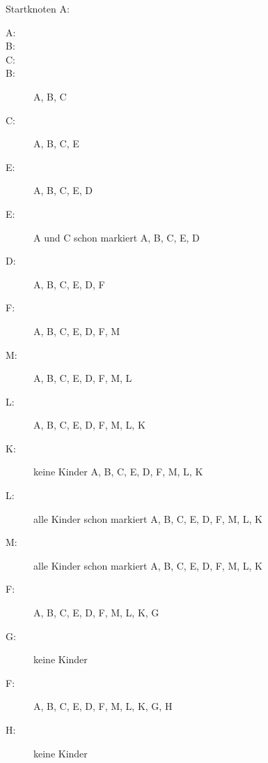 \documentclass{lehramt-informatik-haupt}
\begin{document}
Startknoten A:

\begin{description}

\item[A:]

\item[B:]

\item[C:]

\item[B:]
A, B, C

\item[C:]
A, B, C, E

\item[E:]
A, B, C, E, D

\item[E:]
A und C schon
markiert
A, B, C, E, D

\item[D:]
A, B, C, E, D, F

\item[F:]
A, B, C, E, D, F, M

\item[M:]
A, B, C, E, D, F, M, L

\item[L:]
A, B, C, E, D, F, M, L, K

\item[K:] keine Kinder
A, B, C, E, D, F, M, L, K

\item[L:] alle Kinder schon markiert
A, B, C, E, D, F, M, L, K

\item[M:] alle Kinder schon markiert
A, B, C, E, D, F, M, L, K

\item[F:]
A, B, C, E, D, F, M, L, K, G

\item[G:] keine Kinder

\item[F:]
A, B, C, E, D, F, M, L, K, G, H

\item[H:] keine Kinder


\end{description}
\end{document}
